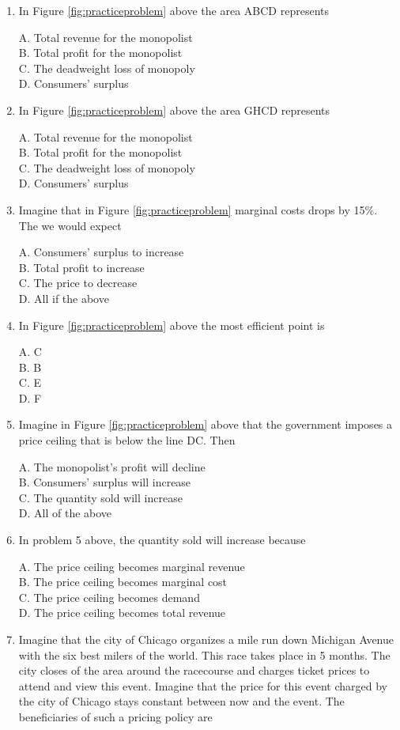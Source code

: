 \documentclass[
]{book}
\begin{document}
\begin{enumerate}
\def\labelenumi{\arabic{enumi}.}
\item
  In Figure \ref{fig:practiceproblem} above the area ABCD represents

  A. Total revenue for the monopolist\\
  B. Total profit for the monopolist\\
  C. The deadweight loss of monopoly\\
  D. Consumers' surplus
\item
  In Figure \ref{fig:practiceproblem} above the area GHCD represents

  A. Total revenue for the monopolist\\
  B. Total profit for the monopolist\\
  C. The deadweight loss of monopoly\\
  D. Consumers' surplus
\item
  Imagine that in Figure \ref{fig:practiceproblem} marginal costs drops by 15\%. The we would expect

  A. Consumers' surplus to increase\\
  B. Total profit to increase\\
  C. The price to decrease\\
  D. All if the above
\item
  In Figure \ref{fig:practiceproblem} above the most efficient point is

  A. C\\
  B. B\\
  C. E\\
  D. F
\item
  Imagine in Figure \ref{fig:practiceproblem} above that the government imposes a price ceiling that is below the line DC. Then

  A. The monopolist's profit will decline\\
  B. Consumers' surplus will increase\\
  C. The quantity sold will increase\\
  D. All of the above
\item
  In problem 5 above, the quantity sold will increase because

  A. The price ceiling becomes marginal revenue\\
  B. The price ceiling becomes marginal cost\\
  C. The price ceiling becomes demand\\
  D. The price ceiling becomes total revenue
\item
  Imagine that the city of Chicago organizes a mile run down Michigan Avenue with the six best milers of the world. This race takes place in 5 months. The city closes of the area around the racecourse and charges ticket prices to attend and view this event. Imagine that the price for this event charged by the city of Chicago stays constant between now and the event. The beneficiaries of such a pricing policy are


\end{enumerate}
\end{document}
